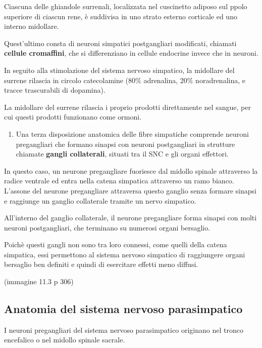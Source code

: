 \documentclass[]{article}
\begin{document}
Ciascuna delle ghiandole surrenali, localizzata nel cuscinetto adiposo
sul ppolo superiore di ciascun rene, è suddivisa in uno strato esterno
corticale ed uno interno midollare.

Quest'ultimo consta di neuroni simpatici postgangliari modificati,
chiamati \textbf{cellule cromaffini}, che si differenziano in cellule
endocrine invece che in neuroni.

In seguito alla stimolazione del sistema nervoso simpatico, la midollare
del surrene rilascia in circolo catecolamine (80\% adrenalina, 20\%
noradrenalina, e tracce trascurabili di dopamina).

La midollare del surrene rilascia i proprio prodotti direttamente nel
sangue, per cui questi prodotti funzionano come ormoni.

\begin{enumerate}
\def\labelenumi{\arabic{enumi}.}
\setcounter{enumi}{2}
\itemsep1pt\parskip0pt
\item
  Una terza disposizione anatomica delle fibre simpatiche comprende
  neuroni pregangliari che formano sinapsi con neuroni postgangliari in
  strutture chiamate \textbf{gangli collaterali}, situati tra il SNC e
  gli organi effettori.
\end{enumerate}

In questo caso, un neurone pregangliare fuoriesce dal midollo spinale
attraverso la radice ventrale ed entra nella catena simpatica attraverso
un ramo bianco. L'assone del neurone pregangliare attraversa questo
ganglio senza formare sinapsi e raggiunge un ganglio collaterale tramite
un nervo simpatico.

All'interno del ganglio collaterale, il neurone pregangliare forma
sinapsi con molti neuroni postgangliari, che terminano su numerosi
organi bersaglio.

Poichè questi gangli non sono tra loro connessi, come quelli della
catena simpatica, essi permettono al sistema nervoso simpatico di
raggiungere organi bersaglio ben definiti e quindi di esercitare effetti
meno diffusi.

(immagine 11.3 p 306)

\subsection{Anatomia del sistema nervoso
parasimpatico}\label{anatomia-del-sistema-nervoso-parasimpatico}

I neuroni pregangliari del sistema nervoso parasimpatico originano nel
tronco encefalico o nel midollo spinale sacrale.
\end{document}
